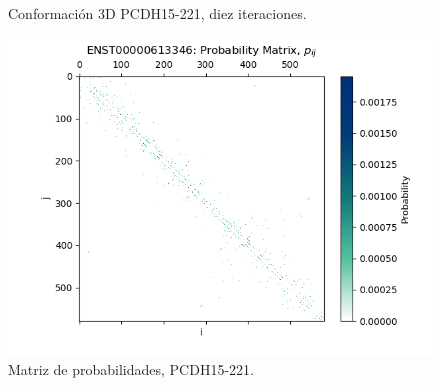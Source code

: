 \documentclass[a4paper,11pt,titlepage]{article}
\theoremstyle{definition}
\begin{document}
\begin{figure}[H]
\begin{minipage}[c]{0.31\textwidth}
        \caption{Conformación 3D PCDH15-221, diez iteraciones.}
        \label{fig:PCDH15-221-multi}
    \end{minipage}
    \hfill
    \begin{minipage}[c]{0.31\textwidth}
        \centering
        \includegraphics[width=\textwidth]{images/PCDH15-221-db_iter-matrix.png}
        \caption{Matriz de probabilidades, PCDH15-221.}
        \label{fig:PCDH15-221-matrix}
    \end{minipage}
\end{figure}
\end{document}
